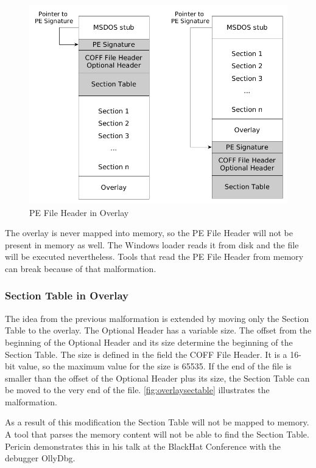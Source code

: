 \begin{figure}
\includegraphics[width=.98\textwidth, height=.60\textheight,keepaspectratio]{graphics/overlayheader}
\caption{PE File Header in Overlay }
\label{fig:overlayheader} 
\end{figure}

The overlay is never mapped into memory, so the PE File Header will not be present in memory as well. The Windows loader reads it from disk and the file will be executed nevertheless. Tools that read the PE File Header from memory can break because of that malformation.

\subsubsection*{Section Table in Overlay}

The idea from the previous malformation is extended by moving only the Section Table to the overlay. The Optional Header has a variable size. The offset from the beginning of the Optional Header and its size determine the beginning of the Section Table. The size is defined in the field  the COFF File Header. It is a 16-bit value, so the maximum value for the size is 65535. If the end of the file is smaller than the offset of the Optional Header plus its size, the Section Table can be moved to the very end of the file. \autoref{fig:overlaysectable} illustrates the malformation.

As a result of this modification the Section Table will not be mapped to memory. A tool that parses the memory content will not be able to find the Section Table. Pericin demonstrates this in his talk at the BlackHat Conference with the debugger OllyDbg. \cite[min.\thinspace{}14:45]{vuksan11} 

